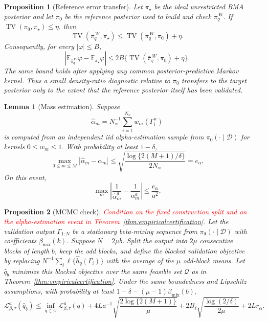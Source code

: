 \documentclass[twoside,11pt]{article}
\newtheorem{lemma}{Lemma}
\newtheorem{proposition}{Proposition}
\newcommand{\D}{\mathcal{D}}
\newcommand{\E}{\mathbb{E}}
\newcommand{\TV}{\operatorname{TV}}
\newcommand{\rev}[1]{\textcolor{red}{#1}}
\begin{document}
\begin{proposition}[Reference error transfer]
\label{prop:referenceerror}
Let \(\pi_\star\) be the ideal unrestricted BMA posterior and let \(\pi_0\) be the reference posterior used to build and check \(\bar\pi_q^{\,W}\). If \(\TV(\pi_0,\pi_\star)\le\eta\), then
\[
\TV(\bar\pi_q^{\,W},\pi_\star) \le \TV(\bar\pi_q^{\,W},\pi_0)+\eta .
\]
Consequently, for every \(|\varphi|\le B\),
\[
\left| \E_{\bar\pi_q^{\,W}}\varphi-\E_{\pi_\star}\varphi \right| \le 2B\{\TV(\bar\pi_q^{\,W},\pi_0)+\eta\}.
\]
The same bound holds after applying any common posterior-predictive Markov kernel. Thus a small density-ratio diagnostic relative to \(\pi_0\) transfers to the target posterior only to the extent that the reference posterior itself has been validated.
\end{proposition}

\begin{lemma}[Mass estimation]
\label{lem:alphaestimation}
Suppose
\[
\widehat\alpha_m = N_\alpha^{-1}\sum_{i=1}^{N_\alpha}w_m(\Gamma_i^\alpha)
\]
is computed from an independent iid alpha-estimation sample from $\pi_0(\cdot\mid\D)$ for kernels $0\le w_m\le1$. With probability at least $1-\delta$,
\[
\max_{0\le m\le M}|\widehat\alpha_m-\alpha_m| \le \sqrt{\frac{\log\{2(M+1)/\delta\}}{2N_\alpha}} =e_\alpha.
\]
On this event,
\[
\max_m \left| \frac1{\widehat\alpha_m^a} - \frac1{\alpha_m^a} \right| \le \frac{e_\alpha}{a^2}.
\]
\end{lemma}

\begin{proposition}[MCMC check]
\label{prop:mixingcertification}
\rev{Condition on the fixed construction split and on the alpha-estimation event in Theorem~\ref{thm:empiricalcertification}.} Let the validation output \(\Gamma_{1:N}\) be a stationary beta-mixing sequence from \(\pi_0(\cdot\mid\D)\) with coefficients \(\beta_{\mathrm{mix}}(k)\). Suppose \(N=2\mu b\). Split the output into \(2\mu\) consecutive blocks of length \(b\), keep the odd blocks, and define the blocked validation objective by replacing \(N^{-1}\sum_i\ell\{\widehat h_q(\Gamma_i)\}\) with the average of the \(\mu\) odd-block means. Let \(\widehat q_b\) minimize this blocked objective over the same feasible set \(\mathcal Q\) as in Theorem~\ref{thm:empiricalcertification}. Under the same boundedness and Lipschitz assumptions, with probability at least \(1-\delta-(\mu-1)\beta_{\mathrm{mix}}(b)\),
\[
\mathcal L_{\beta,\tau}^a(\widehat q_b) \le \inf_{q\in\mathcal Q}\mathcal L_{\beta,\tau}^a(q) + 4La^{-1}\sqrt{\frac{2\log\{2(M+1)\}}{\mu}} + 2B_\ell\sqrt{\frac{\log(2/\delta)}{2\mu}} + 2L r_\alpha .
\]
\end{proposition}
\end{document}
